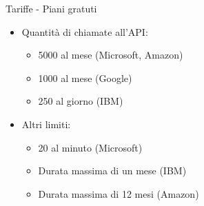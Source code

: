 %
\begin{frame}[t]{Tariffe - Piani gratuti}
\begin{itemize}
	\item Quantità di chiamate all'API:
	\begin{itemize}
		\item 5000 al mese (Microsoft, Amazon)
		\item 1000 al mese (Google)
		\item 250 al giorno (IBM)
	\end{itemize}
	\item Altri limiti:
	\begin{itemize}
		\item 20 al minuto (Microsoft)
		\item Durata massima di un mese (IBM)
		\item Durata massima di 12 mesi (Amazon)
	\end{itemize}
\end{itemize}
\end{frame}
%
